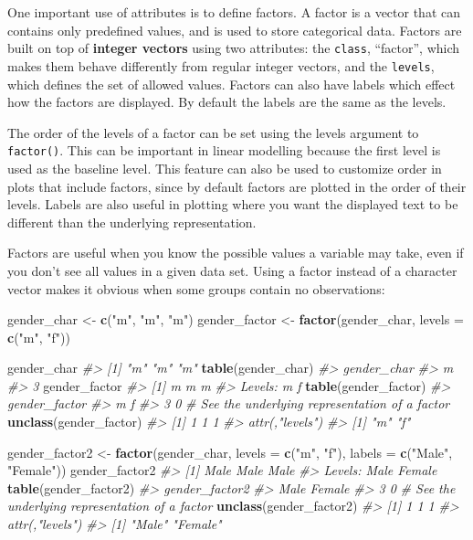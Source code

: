 \documentclass[]{book}
\newenvironment{Shaded}{\begin{snugshade}}{\end{snugshade}}
\newcommand{\KeywordTok}[1]{\textcolor[rgb]{0.13,0.29,0.53}{\textbf{#1}}}
\newcommand{\DataTypeTok}[1]{\textcolor[rgb]{0.13,0.29,0.53}{#1}}
\newcommand{\StringTok}[1]{\textcolor[rgb]{0.31,0.60,0.02}{#1}}
\newcommand{\CommentTok}[1]{\textcolor[rgb]{0.56,0.35,0.01}{\textit{#1}}}
\newcommand{\NormalTok}[1]{#1}
\theoremstyle{definition}
\theoremstyle{definition}
\theoremstyle{definition}
\theoremstyle{remark}
\begin{document}
One important use of attributes is to define factors. A factor is a
vector that can contains only predefined values, and is used to store
categorical data. Factors are built on top of \textbf{integer vectors}
using two attributes: the \texttt{class}, ``factor'', which makes them
behave differently from regular integer vectors, and the
\texttt{levels}, which defines the set of allowed values. Factors can
also have labels which effect how the factors are displayed. By default
the labels are the same as the levels.

The order of the levels of a factor can be set using the levels argument
to \texttt{factor()}. This can be important in linear modelling because
the first level is used as the baseline level. This feature can also be
used to customize order in plots that include factors, since by default
factors are plotted in the order of their levels. Labels are also useful
in plotting where you want the displayed text to be different than the
underlying representation.

Factors are useful when you know the possible values a variable may
take, even if you don't see all values in a given data set. Using a
factor instead of a character vector makes it obvious when some groups
contain no observations:

\begin{Shaded}
\begin{Highlighting}[]
\NormalTok{gender_char <-}\StringTok{ }\KeywordTok{c}\NormalTok{(}\StringTok{"m"}\NormalTok{, }\StringTok{"m"}\NormalTok{, }\StringTok{"m"}\NormalTok{)}
\NormalTok{gender_factor <-}\StringTok{ }\KeywordTok{factor}\NormalTok{(gender_char, }\DataTypeTok{levels =} \KeywordTok{c}\NormalTok{(}\StringTok{"m"}\NormalTok{, }\StringTok{"f"}\NormalTok{))}

\NormalTok{gender_char}
\CommentTok{#> [1] "m" "m" "m"}
\KeywordTok{table}\NormalTok{(gender_char)}
\CommentTok{#> gender_char}
\CommentTok{#> m }
\CommentTok{#> 3}
\NormalTok{gender_factor}
\CommentTok{#> [1] m m m}
\CommentTok{#> Levels: m f}
\KeywordTok{table}\NormalTok{(gender_factor)}
\CommentTok{#> gender_factor}
\CommentTok{#> m f }
\CommentTok{#> 3 0}
\CommentTok{# See the underlying representation of a factor}
\KeywordTok{unclass}\NormalTok{(gender_factor)}
\CommentTok{#> [1] 1 1 1}
\CommentTok{#> attr(,"levels")}
\CommentTok{#> [1] "m" "f"}

\NormalTok{gender_factor2 <-}\StringTok{ }\KeywordTok{factor}\NormalTok{(gender_char, }\DataTypeTok{levels =} \KeywordTok{c}\NormalTok{(}\StringTok{"m"}\NormalTok{, }\StringTok{"f"}\NormalTok{), }\DataTypeTok{labels =} \KeywordTok{c}\NormalTok{(}\StringTok{"Male"}\NormalTok{, }\StringTok{"Female"}\NormalTok{))}
\NormalTok{gender_factor2}
\CommentTok{#> [1] Male Male Male}
\CommentTok{#> Levels: Male Female}
\KeywordTok{table}\NormalTok{(gender_factor2)}
\CommentTok{#> gender_factor2}
\CommentTok{#>   Male Female }
\CommentTok{#>      3      0}
\CommentTok{# See the underlying representation of a factor}
\KeywordTok{unclass}\NormalTok{(gender_factor2)}
\CommentTok{#> [1] 1 1 1}
\CommentTok{#> attr(,"levels")}
\CommentTok{#> [1] "Male"   "Female"}
\end{Highlighting}
\end{Shaded}
\end{document}
